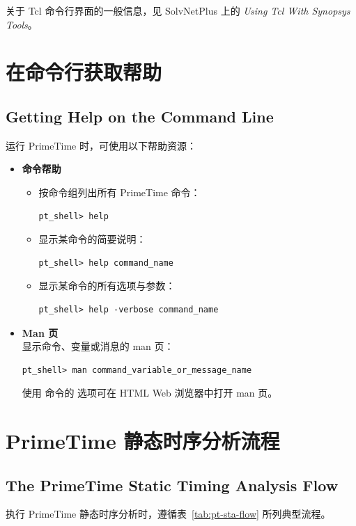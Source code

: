 关于 Tcl 命令行界面的一般信息，见 SolvNetPlus 上的 \textit{Using Tcl With Synopsys Tools}。

\section{在命令行获取帮助}
\subsection*{Getting Help on the Command Line}

运行 PrimeTime 时，可使用以下帮助资源：
\begin{itemize}
  \item \textbf{命令帮助}
  \begin{itemize}
    \item 按命令组列出所有 PrimeTime 命令：
\begin{lstlisting}
pt_shell> help
\end{lstlisting}
    \item 显示某命令的简要说明：
\begin{lstlisting}
pt_shell> help command_name
\end{lstlisting}
    \item 显示某命令的所有选项与参数：
\begin{lstlisting}
pt_shell> help -verbose command_name
\end{lstlisting}
  \end{itemize}
  \item \textbf{Man 页}\\
        显示命令、变量或消息的 man 页：
\begin{lstlisting}
pt_shell> man command_variable_or_message_name
\end{lstlisting}
        使用  命令的  选项可在 HTML Web 浏览器中打开 man 页。
\end{itemize}

\section{PrimeTime 静态时序分析流程}
\subsection*{The PrimeTime Static Timing Analysis Flow}

执行 PrimeTime 静态时序分析时，遵循表~\ref{tab:pt-sta-flow} 所列典型流程。


